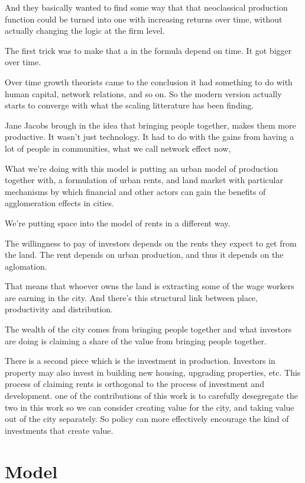 \documentclass[]{article}
\begin{document}
And they basically wanted to find some way that that neoclassical production function could be turned into one with increasing returns over time, without actually changing the logic at the firm level.

The first trick was to make that a in the formula depend on time. It got bigger over time.

Over time  growth theorists came to the conclusion it had something to do with human capital, network relations, and so on. So the modern version actually starts to converge with what the scaling litterature has been finding. 

Jane Jacobs brough in the idea that bringing people together, makes them more productive. It wasn't just technology. It had to do with the gains from having a lot of people in communities,  what we call  network effect now,


What we're doing with this model is putting an urban model of production together with, a formulation of urban rents, and land market with particular mechanisms by which financial and other actors can gain the benefits of agglomeration effects in cities. 

We're putting space into the model of rents in a different way. 

The willingness to pay of investors depends on the rents they expect to get from the land.
 The rent depends on urban production, and thus it depends on the aglomation. 
 
That means that whoever owns the land is extracting some of the wage workers are earning in the city.
And there's this structural link between place, productivity and distribution. 

The wealth of the city comes from bringing people together and  what investors are doing is  claiming a share of the value from bringing people together. 

There is a second piece which is the investment in production. Investors in property may also invest in building new housing, upgrading properties, etc. 
This process of claiming rents  is orthogonal to the process of investment and development.
one of the contributions of this work is to carefully desegregate the two in this work so we can consider creating value for the city, and taking value out of the city separately. 
So policy can more effectively encourage the kind of investments that create value. 


\section{Model}
\end{document}
